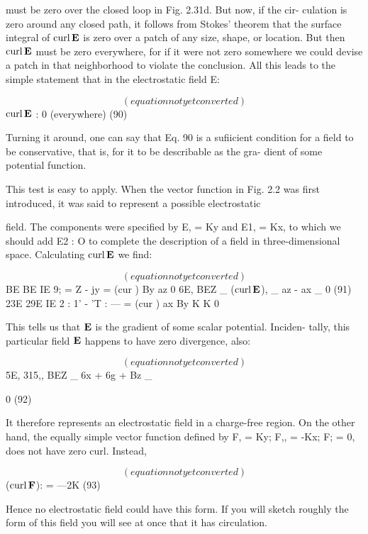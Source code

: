 {must be zero over the closed loop in Fig. 2.31d. But now, if the cir-
culation is zero around any closed path, it follows from Stokes'
theorem that the surface integral of $\operatorname{curl}\mathbf{E}$ is zero over a patch of any
size, shape, or location. But then $\operatorname{curl}\mathbf{E}$ must be zero everywhere,
for if it were not zero somewhere we could devise a patch in that
neighborhood to violate the conclusion. All this leads to the simple
statement that in the electrostatic field E:

\begin{equation}
(equation not yet converted)
\end{equation}
$\operatorname{curl}\mathbf{E}$ : 0 (everywhere) (90)

Turning it around, one can say that Eq. 90 is a sufiicient condition for
a field to be conservative, that is, for it to be describable as the gra-
dient of some potential function.

This test is easy to apply. When the vector function in Fig. 2.2
was first introduced, it was said to represent a possible electrostatic

field. The components were specified by E, = Ky and E1, = Kx, to
which we should add E2 : O to complete the description of a field
in three-dimensional space. Calculating $\operatorname{curl}\mathbf{E}$ we find:

\begin{equation}
(equation not yet converted)
\end{equation}
BE BE
IE 9; = Z - jy =
(cur ) By az 0
6E, BEZ _
($\operatorname{curl}\mathbf{E}$), _ az - ax _ 0 (91)
23E 29E
IE 2 : 1' - 'T : --- =
(cur ) ax By K K 0

This tells us that $\mathbf{E}$ is the gradient of some scalar potential. Inciden-
tally, this particular field $\mathbf{E}$ happens to have zero divergence, also:

\begin{equation}
(equation not yet converted)
\end{equation}
5E, 315,, BEZ _
6x + 6g + Bz _

0 (92)

It therefore represents an electrostatic field in a charge-free region.
On the other hand, the equally simple vector function defined by
F, = Ky; F,, = -Kx; F; = 0, does not have zero curl. Instead,

\begin{equation}
(equation not yet converted)
\end{equation}
($\operatorname{curl}\mathbf{F}$): = ---2K (93)

Hence no electrostatic field could have this form. If you will sketch
roughly the form of this field you will see at once that it has
circulation.

}
